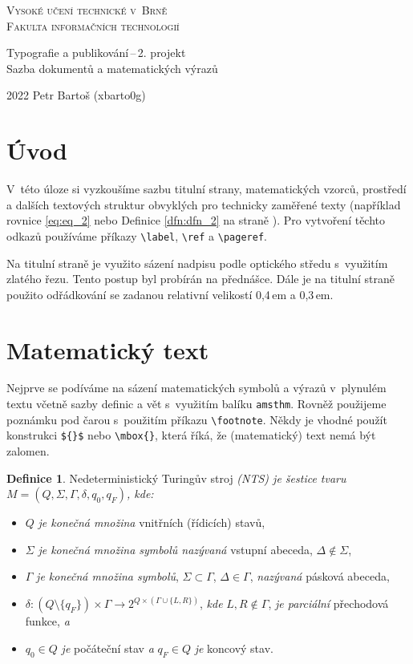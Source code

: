 \documentclass[twocolumn, 11pt, a4paper, titlepage]{article}
\theoremstyle{definition}
\newtheorem{dfn}{Definice}
\begin{document}
\begin{titlepage}
\begin{center}
{\Huge\textsc{
Vysoké učení technické v~Brně\\[0.4em]}}
{\huge\textsc{
Fakulta informačních technologií}}

{\LARGE
Typografie a publikování\,--\,2. projekt\\[0.3em]
Sazba dokumentů a matematických výrazů
}
\end{center}

{\Large
2022
\hfill
Petr Bartoš (xbarto0g)
}
\end{titlepage}
\section*{Úvod}
V~této úloze si vyzkoušíme sazbu titulní strany, matematických vzorců, prostředí a dalších textových struktur obvyklých pro technicky zaměřené texty (například rovnice \eqref{eq:eq_2} nebo Definice \ref{dfn:dfn_2} na straně \pageref{dfn:dfn_2}). Pro vytvoření těchto odkazů používáme příkazy \verb|\label|, \verb|\ref| a \verb|\pageref|.

Na titulní straně je využito sázení nadpisu podle optického středu s~využitím zlatého řezu. Tento postup byl probírán na přednášce. Dále je na titulní straně použito odřádkování se zadanou relativní velikostí 0,4\,em a 0,3\,em.

\section{Matematický text}
Nejprve se podíváme na sázení matematických symbolů a výrazů v~plynulém textu včetně sazby definic a vět s~využitím balíku \verb|amsthm|. Rovněž použijeme poznámku pod čarou s~použitím příkazu \verb|\footnote|. Někdy je vhodné použít konstrukci \verb|${}$| nebo \verb|\mbox{}|, která říká, že (matematický) text nemá být zalomen. 

\begin{dfn}\label{dfn:dfn_1}Nedeterministický Turingův stroj \emph{(NTS) je šestice tvaru $M = (Q, \Sigma, \Gamma, \delta, q_0, q_F)$, kde:}\end{dfn}
\begin{itemize}
\item $Q$ \emph{je konečná množina} vnitřních (řídicích) stavů,
\item $\Sigma$ \emph{je konečná množina symbolů nazývaná} vstupní abeceda, $\Delta \not \in \Sigma$,
\item $\Gamma$ \emph{je konečná množina symbolů}, $\Sigma \subset \Gamma$, $\Delta \in \Gamma$, \emph{nazývaná} pásková abeceda,
\item $\delta : (Q \setminus \{q_F\}) \times \Gamma \rightarrow 2^{Q \times (\Gamma \cup \{L,R\})}$, \emph{kde} $L, R \not \in \Gamma$, \emph{je parciální} přechodová funkce, \emph{a}
\item $q_0 \in Q$ \emph{je} počáteční stav \emph{a} $q_F \in Q$ \emph{je} koncový stav. 
\end{itemize}
\end{document}
